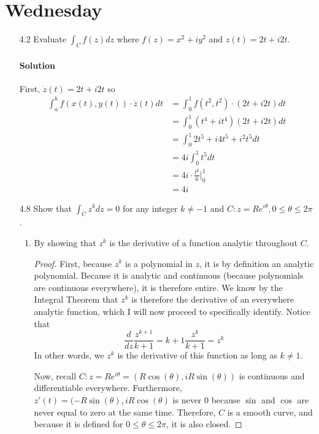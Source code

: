 \documentclass[11pt]{article}
\begin{document}
\section{Wednesday}
\begin{enumerate}
	\item[4.2] Evaluate $\int_C f(z) dz$ where $f(z) = x^2 + iy^2$ and $z(t) = 2t + i2t$.
	\paragraph{Solution} First,
	$\dot{z}(t) = 2t + i2t$ so
	\[\begin{aligned}
	\int^b_a f(x(t), y(t)) \cdot \dot{z}(t) dt
	&= \int^1_0 f(t^2, t^2) \cdot (2t + i2t) dt \\
	&= \int^1_0 (t^4 + it^4)(2t + i2t) dt \\
	&= \int^1_0 2t^5 + i4t^5 + i^2t^5 dt \\
	&= 4i\int^1_0 t^5 dt \\
	&= 4i \cdot \frac{t^6}{6}|^1_0 \\
	&= 4i
	\end{aligned}\]
	
	\item[4.8] Show that $\int_C z^k dz = 0$ for any integer $k \neq -1$ and $C: z = Re^{i\theta}, 0 \leq \theta \leq 2\pi$.
		\begin{enumerate}
			\item By showing that $z^k$ is the derivative of a function analytic throughout $C$.
			
			\begin{proof}
				First, because $z^k$ is a polynomial in $z$, it is by definition an analytic polynomial. Because it is analytic and continuous (because polynomials are continuous everywhere), it is therefore entire. We know by the Integral Theorem that $z^k$ is therefore the derivative of an everywhere analytic function, which I will now proceed to specifically identify. Notice that 
				\[\frac{d}{dz} \frac{z^{k+1}}{k+1} = k + 1 \frac{z^{k}}{k+1} = z^k \]
				In other words, we $z^k$ is the derivative of this function as long as $k \neq 1$.
				
				\bigskip
				Now, recall $C: z = Re^{i\theta} = (R\cos(\theta), iR\sin(\theta))$ is continuous and differentiable everywhere. Furthermore, $z'(t) = (-R\sin(\theta), iR\cos(\theta)$ is never 0 because $\sin$ and $\cos$ are never equal to zero at the same time. Therefore,  $C$ is a smooth curve, and because it is defined for $0 \leq \theta \leq 2\pi$, it is also closed.
				

\end{proof}
\end{enumerate}
\end{enumerate}
\end{document}
